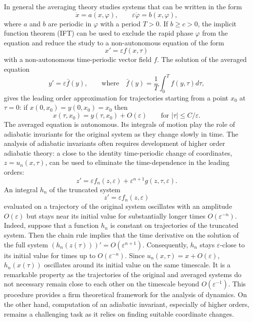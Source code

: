 \documentclass[a4paper,12pt]{article}
\begin{document}
In general the averaging theory studies systems that can be written in the form
\begin{equation}\label{Eq:slow-fast}
\dot x=a(x,\varphi),\qquad \varepsilon \dot \varphi =b(x,\varphi),
\end{equation}
where $a$ and $b$ are periodic in $\varphi$ with a period $T>0$.
If $b\ge c>0$, the implicit function theorem (IFT) can be used to exclude the rapid phase $\varphi$ from the equation
and reduce the study to a non-autonomous equation of the form
\[
x'=\varepsilon f(x,\tau)
\]
with a non-autonomous time-periodic  vector field $f$. The solution of the averaged equation 
\[
y'=\varepsilon\bar f(y),\qquad\text{where}\quad \bar f(y)=\frac{1}{T}\int_0^Tf(y,\tau)d\tau,
\]
gives the leading order approximation for  trajectories
starting from a point $x_0$ at $\tau=0$: if  $x(0,x_0)=y(0,x_0)=x_0$ then
\[
x(\tau,x_0)=y(\tau,x_0)+O(\varepsilon)\qquad\text{for $|\tau|\le C/\varepsilon$}.
\]
The averaged equation is autonomous. Its integrals of motion play the role of
adiabatic invariants for the original system as they change slowly in time. 
The analysis of adiabatic invariants often requires development of
higher order adiabatic theory: a close to the identity time-periodic change of coordinates, $z=u_n(x,\tau)$, can
be used to eliminate the time-dependence in the leading orders: 
\[
z'=\varepsilon f_n(z,\varepsilon)+\varepsilon^{n+1} g(z,\tau,\varepsilon).
\]
An integral $h_n$ of the truncated system
\[z'=\varepsilon f_n(z,\varepsilon)\]
evaluated on a trajectory of the original system oscillates with an amplitude $O(\varepsilon)$
but stays near its initial value for substantially longer times $O(\varepsilon^{-n})$.
Indeed, suppose that a function $h_n$ is constant on trajectories of the truncated system. 
Then
the chain rule implies that the time derivative on the solution of the full
system $(h_n(z(\tau)))'=O(\varepsilon^{n+1})$. Consequently, 
$h_n$ stays $\varepsilon$-close to its initial value for times up to $O(\varepsilon^{-n})$. Since $u_n(x,\tau)=x+O(\varepsilon)$,
$h_n(x(\tau))$ oscillates around its initial value on the same timescale.
It is a remarkable property as the trajectories of the original and averaged systems
do not necessary remain close to each other on the timescale beyond $O(\varepsilon^{-1})$. 
This procedure provides a firm theoretical framework for the analysis of dynamics. On the other hand, computation of an adiabatic invariant, especially of higher orders, remains a challenging task as it relies on finding suitable coordinate changes. 
\end{document}
